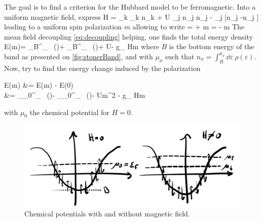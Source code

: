 		The goal is to find a criterion for the Hubbard model to be ferromagnetic. Into a uniform magnetic field, express
		\be \mc H = \sum_{\vb* k \sigma} \epsilon_{\vb* k \sigma} n_{\vb* k \sigma} + U \sum_{\vb* j} n_{\vb* j \uparrow}n_{\vb* j \downarrow} -  \sum_{\vb* j} [n_{\vb* j \uparrow}-n_{\vb* j \downarrow}] \ee
		leading to a uniform spin polarization $m$ allowing to write
		\be {} =  + m   =  - m \ee
		The mean field decoupling \eqref{eq:decoupling} helping, one finds the total energy density
		\be \mc E(m)= \int_B^{\mu_\uparrow} \dd \varepsilon \ \rho(\varepsilon)\varepsilon + \int_B^{\mu_\downarrow} \dd \varepsilon \ \rho(\varepsilon)\varepsilon + U - g\mu_ Hm \ee
		where $B$ is the bottom energy of the band as presented on  \autoref{fig:stonerBand}, and with $\mu_\sigma$ such that $n_\sigma = \int_B^{\mu_\sigma} \dd \varepsilon \ \rho(\varepsilon)$. Now, try to find the energy change induced by the polarization
		\be \begin{split} \Delta \mc E(m) &= \mc E(m) - \mc E(0) \\ &= \int_{\mu_0}^{\mu_\uparrow} \dd \varepsilon \ \rho(\varepsilon)\varepsilon - \int_{\mu_0}^{\mu_\downarrow} \dd \varepsilon \ \rho(\varepsilon)\varepsilon - Um^2 - g\mu_ Hm \end{split} \ee 
		with $\mu_0$ the chemical potential for $H=0$.

		\begin{figure}[h!]
			\centering
			\includegraphics[scale=0.2]{graphs/stonerBand.png}
			\caption{Chemical potentials with and without magnetic field.}
			\label{fig:stonerBand}
		\end{figure}

